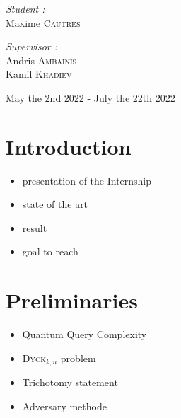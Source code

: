 \documentclass[11pt,a4paper]{article}
\newcommand{\Dyck}[1]{\textsc{Dyck$_{#1}$}}
\theoremstyle{definition}
\theoremstyle{plain}
\theoremstyle{definition}
\begin{document}
\begin{titlepage}
\begin{sffamily}
\begin{center}
            \hspace{-0.8cm}
            \begin{minipage}{0.4\textwidth}
                \begin{flushleft} \large
                    \emph{Student :} \\
                    Maxime \textsc{Cautrès}\\
                \end{flushleft}
            \end{minipage}
            \hspace{3cm}
            \begin{minipage}{0.4\textwidth}
                \begin{flushright} \large
                    \emph{Supervisor :} \\
                    Andris \textsc{Ambainis}\\
                    Kamil \textsc{Khadiev}\\
                \end{flushright}
            \end{minipage}

            \vspace*{0.5cm}

            {\large   May the 2nd 2022 -  July the 22th 2022}
        \end{center}
    \end{sffamily}
\end{titlepage}

\tableofcontents

\newpage




\section{Introduction}
\begin{itemize}
    \item presentation of the Internship
    \item state of the art
    \item result
    \item goal to reach
\end{itemize}


\section{Preliminaries}
\begin{itemize}
    \item Quantum Query Complexity
    \item \Dyck{k, n} problem
    \item Trichotomy statement
    \item Adversary methode
\end{itemize}
\end{document}

